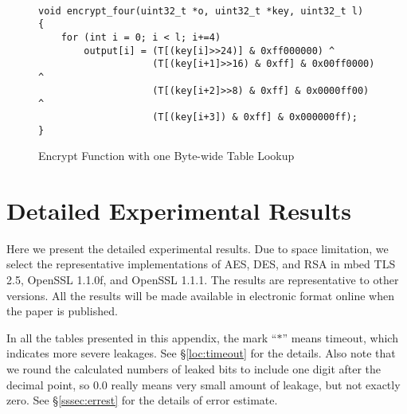 ~\vvv

\begin{figure}[h!]
    \centering
    \begin{lstlisting}[xleftmargin=.02\textwidth,xrightmargin=.01\textwidth]
void encrypt_four(uint32_t *o, uint32_t *key, uint32_t l)
{
    for (int i = 0; i < l; i+=4)
        output[i] = (T[(key[i]>>24)] & 0xff000000) ^
                    (T[(key[i+1]>>16) & 0xff] & 0x00ff0000) ^
                    (T[(key[i+2]>>8) & 0xff] & 0x0000ff00) ^
                    (T[(key[i+3]) & 0xff] & 0x000000ff);
}
    \end{lstlisting}
    \caption{Encrypt Function with one Byte-wide Table Lookup}
    \label{fig:four_byte_table_lookup}
\end{figure}



\newpage
\section{Detailed Experimental Results}
\label{sec:result-table}

Here we present the detailed experimental results.
Due to space limitation, we select the representative implementations of
AES, DES, and RSA in
mbed TLS 2.5,
OpenSSL 1.1.0f,  and
OpenSSL 1.1.1.  
The results are representative to other versions.
All the results will be made available in electronic format online
when the paper is published. %

In all the tables presented in this appendix, the mark ``$*$'' means timeout,
which indicates more severe leakages. See \S\ref{loc:timeout} for the details.
Also note that we round the calculated numbers of leaked bits to include one digit
after the decimal point, so $0.0$ really means very small amount of leakage, but not exactly zero. See \S\ref{sssec:errest} for the details of error estimate.








